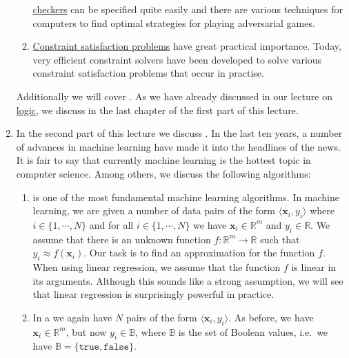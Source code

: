 \begin{enumerate}
\begin{enumerate}
            \href{https://en.wikipedia.org/wiki/checkers}{checkers} can be specified quite easily and there are
            various techniques for computers to find optimal strategies for playing adversarial games.
      \item \href{https://en.wikipedia.org/wiki/Constraint_satisfaction_problem}{Constraint satisfaction problems} 
            have great practical importance.  Today, very efficient constraint solvers have been developed to
            solve various constraint satisfaction problems that occur in practise.
      \end{enumerate}
      Additionally we will cover .  As we have already discussed 
       in our lecture on
      \href{https://github.com/karlstroetmann/Logic}{logic}, we discuss  in
      the last chapter of the first part of this lecture. 
\item In the second part of this lecture we discuss .  In the last ten years, a number of
      advances in machine learning have made it into the headlines of the news.  It is fair to say that
      currently machine learning is the hottest topic in computer science.  Among others, we discuss the following
      algorithms:
      \begin{enumerate}
      \item {} is one of the most fundamental machine learning algorithms.
            In machine learning, we are given a number of data pairs of the form  $\langle \mathbf{x}_i, y_i \rangle$ 
            where $i \in \{1,\cdots,N\}$ and for all $i \in \{1,\cdots,N\}$ we have $\mathbf{x}_i \in \mathbb{R}^m$
            and $y_i \in \mathbb{R}$.  We assume that there is an unknown function $f:\mathbb{R}^m \rightarrow \mathbb{R}$
            such that $y_i \approx f(\mathbf{x}_i)$.  Our task is to find an approximation for the function
            $f$.  When using linear regression, we assume that the function $f$ is linear in its arguments.
            Although this sounds like a strong assumption, we will see that linear regression is surprisingly
            powerful in practice.
      \item In a  we again have $N$ pairs of the form $\langle \mathbf{x}_i, y_i
        \rangle$.
            As before,  we have $\mathbf{x}_i \in \mathbb{R}^m$, but now $y_i \in \mathbb{B}$, where
            $\mathbb{B}$ is the set of Boolean values, i.e.~we have $\mathbb{B} = \{\mathtt{true}, \mathtt{false}\}$.

\end{enumerate}
\end{enumerate}
